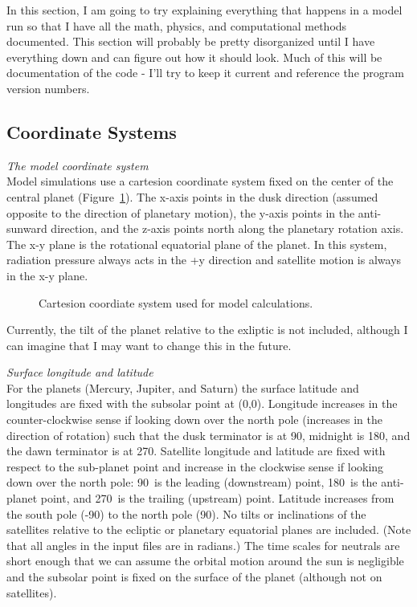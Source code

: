 \documentclass[11pt]{article}
\begin{document}
In this section, I am going to try explaining everything that happens in a
model run so that I have all the math, physics, and computational methods
documented. This section will probably be pretty disorganized until I have
everything down and can figure out how it should look. Much of this will be
documentation of the code - I'll try to keep it current and reference the
program version numbers.

\subsection{Coordinate Systems} \label{sec:coordsystems}

\textit{The model coordinate system} \\
Model simulations use a cartesion coordinate system fixed on the center of the
central planet (Figure~\ref{fig:coordinates}). The x-axis points in the dusk
direction (assumed opposite to the direction of planetary motion), the y-axis
points in the anti-sunward direction, and the z-axis points north along the
planetary rotation axis. The x-y plane is the rotational equatorial plane of
the planet. In this system, radiation pressure always acts in the +y direction
and satellite motion is always in the x-y plane. 

\begin{figure}
\caption{Cartesion coordiate system used for model calculations.}
\label{fig:coordinates}
\end{figure}

Currently, the tilt of the planet relative to the exliptic is not included,
although I can imagine that I may want to change this in the future.

\textit{Surface longitude and latitude} \\
For the planets (Mercury, Jupiter, and Saturn) the surface latitude and
longitudes are fixed with the subsolar point at (0\degr,0\degr). Longitude
increases in the counter-clockwise sense if looking down over the north pole
(increases in the direction of rotation) 
such that the dusk terminator is at 90\degr, midnight is
180\degr, and the dawn terminator is at 270\degr. Satellite longitude and
latitude are fixed with respect to the sub-planet point and increase in the
clockwise sense if looking down over the north pole:
90\degr\ is the leading (downstream) point, 180\degr\ is the anti-planet 
point, and 270\degr\ is the trailing (upstream) point. Latitude increases from
the south pole (-90\degr) to the north pole (90\degr). No tilts or inclinations
of the satellites relative to the ecliptic or planetary equatorial planes are
included. (Note that all angles in the input files are in radians.) The time
scales for neutrals are short enough that we can assume the orbital motion
around the sun is negligible and the subsolar point is fixed on the surface
of the planet (although not on satellites).
\end{document}
